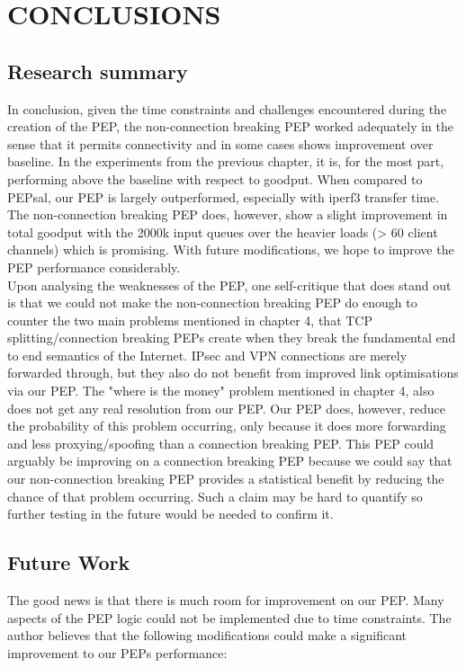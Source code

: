 \documentclass{uathesis}
\begin{document}
\chapter{CONCLUSIONS}

\section{Research summary}
In conclusion, given the time constraints and challenges encountered during the creation of the PEP, the non-connection breaking PEP worked adequately in the sense that it permits connectivity and in some cases shows improvement over baseline. In the experiments from the previous chapter, it is, for the most part, performing above the baseline with respect to goodput. When compared to PEPsal, our PEP is largely outperformed, especially with iperf3 transfer time. The non-connection breaking PEP does, however, show a slight improvement in total goodput with the 2000k input queues over the heavier loads (> 60 client channels) which is promising. With future modifications, we hope to improve the PEP performance considerably. \\

Upon analysing the weaknesses of the PEP, one self-critique that does stand out is that we could not make the non-connection breaking PEP do enough to counter the two main problems mentioned in chapter 4, that TCP splitting/connection breaking PEPs create when they break the fundamental end to end semantics of the Internet. IPsec and VPN connections are merely forwarded through, but they also do not benefit from improved link optimisations via our PEP. The "where is the money" problem mentioned in chapter 4, also does not get any real resolution from our PEP. Our PEP does, however, reduce the probability of this problem occurring, only because it does more forwarding and less proxying/spoofing than a connection breaking PEP. This PEP could arguably be improving on a connection breaking PEP because we could say that our non-connection breaking PEP provides a statistical benefit by reducing the chance of that problem occurring. Such a claim may be hard to quantify so further testing in the future would be needed to confirm it.

\section{Future Work}
The good news is that there is much room for improvement on our PEP. Many aspects of the PEP logic could not be implemented due to time constraints. The author believes that the following modifications could make a significant improvement to our PEPs performance:\\
\end{document}
